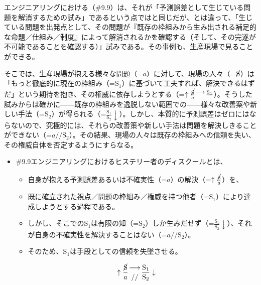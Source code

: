 エンジニアリングにおける（\#9.9）は、それが「予測誤差として生じている問題を解消するための試み」であるという点ではと同じだが、とは違って、「生じている問題を出発点として、その問題が『既存の枠組みから生み出される補足的な命題／仕組み／制度』によって解消されるかを確認する（そして、その完遂が不可能であることを確認する）」試みである。その事例も、生産現場で見ることができる。

そこでは、生産現場が抱える様々な問題（=\(a\)）に対して、現場の人々（=\(\cancel{\textrm{S}}\)）は「もっと徹底的に現在の枠組み（=\(\textrm{S}_1\)）に基づいて工夫すれば、解決できるはずだ」という期待を抱き、その権威に依存しようとする（=\(\uparrow\frac{\cancel{\textrm{S}}}{a}\genfrac{}{}{0pt}{}{\longrightarrow}{}\frac{\textrm{S}_1}{}\)）。そうした試みからは確かに――既存の枠組みを逸脱しない範囲での――様々な改善案や新しい手法（=\(\textrm{S}_2\)）が得られる（=\(\frac{\textrm{S}_1}{\textrm{S}_2}\downarrow\)）。しかし、本質的に予測誤差はゼロにはならないので、究極的には、それらの改善策や新しい手法は問題を解決しきることができない（=\(a//\textrm{S}_2\)）。その結果、現場の人々は既存の枠組みへの信頼を失い、その権威自体を否定するようにすらなる。

\begin{note}{}
  \begin{itemize}
    \tightlist
    \item{\#9.9}エンジニアリングにおけるヒステリー者のディスクールとは、
      \begin{itemize}
        \tightlist
        \item 自身が抱える予測誤差あるいは不確実性（=$a$）の解決（=$\uparrow\frac{\cancel{\textrm{S}}}{a}$）を、
        \item 既に確立された視点／問題の枠組み／権威を持つ他者（=$\textrm{S}_1$）により達成しようとする過程である。
        \item しかし、そこでの$\textrm{S}_1$は有限の知（=$\textrm{S}_2$）しか生みだせず（=$\frac{\textrm{S}_1}{\textrm{S}_2}\downarrow$）、それが自身の不確実性を解決することはない（=$a//\textrm{S}_2$）。
        \item そのため、$\textrm{S}_1$は手段としての信頼を失墜させる。
      \end{itemize}

$$
\uparrow\frac{\cancel{\textrm{S}}}{a}\genfrac{}{}{0pt}{}{\longrightarrow}{//}\frac{\mathrm{S_1}}{\mathrm{S_2}}\downarrow
$$
  \end{itemize}
\end{note}

